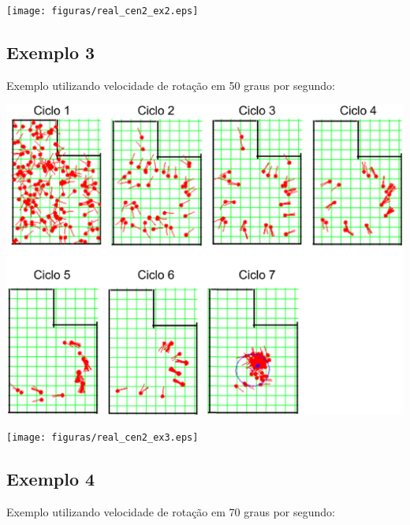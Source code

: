 {\centering
\texttt{[image: figuras/real\_cen2\_ex2.eps]}
\label{img:real_cen2_ex2}
\par}

\subsection{Exemplo 3}

Exemplo utilizando velocidade de rotação em 50 graus por segundo:

{\centering
\includegraphics[scale=0.4]{figuras/cen2_ex3.eps}
\label{img:cen2_ex3}
\par}

{\centering
\texttt{[image: figuras/real\_cen2\_ex3.eps]}
\label{img:real_cen2_ex3}
\par}

\subsection{Exemplo 4}

Exemplo utilizando velocidade de rotação em 70 graus por segundo:

